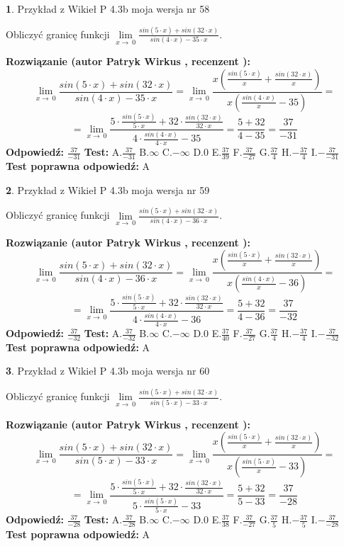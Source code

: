 \documentclass[12pt, a4paper]{article}
\theoremstyle{definition} %
\newtheorem{zad}{}
\newcommand{\zadStart}[1]{\begin{zad}#1\newline}
\newcommand{\zadStop}{\end{zad}}
\newcommand{\rozwStart}[2]{\noindent \textbf{Rozwiązanie (autor #1 , recenzent #2): }\newline}
\newcommand{\rozwStop}{\newline}
\newcommand{\odpStart}{\noindent \textbf{Odpowiedź:}\newline}
\newcommand{\odpStop}{\newline}
\newcommand{\testStart}{\noindent \textbf{Test:}\newline}
\newcommand{\testStop}{\newline}
\newcommand{\kluczStart}{\noindent \textbf{Test poprawna odpowiedź:}\newline}
\newcommand{\kluczStop}{\newline}
\begin{document}
\zadStart{Przykład z Wikieł P 4.3b moja wersja nr 58}


Obliczyć granicę funkcji $\lim\limits_{x\to\ 0}\frac{sin(5 \cdot x)+sin(32 \cdot x)}{sin(4 \cdot x)-35 \cdot x}$.
\zadStop
\rozwStart{Patryk Wirkus}{}
$$\lim\limits_{x\to\ 0}\frac{sin(5 \cdot x)+sin(32 \cdot x)}{sin(4 \cdot x)-35 \cdot x}=\lim\limits_{x\to\ 0}\frac{x(\frac{sin(5 \cdot x)}{x}+\frac{sin(32 \cdot x)}{x})}{x(\frac{sin(4 \cdot x)}{x}-35)}=$$
$$=\lim\limits_{x\to\ 0}\frac{5 \cdot \frac{sin(5 \cdot x)}{5 \cdot x}+32 \cdot \frac{sin(32 \cdot x)}{32 \cdot x}}{4 \cdot \frac{sin(4 \cdot x)}{4 \cdot x}-35}=\frac{5+32}{4-35} = \frac{37}{-31}$$
\rozwStop
\odpStart
$\frac{37}{-31}$
\odpStop
\testStart
A.$\frac{37}{-31}$
B.$\infty$
C.$-\infty$
D.$0$
E.$\frac{37}{39}$
F.$\frac{37}{-27}$
G.$\frac{37}{4}$
H.$-\frac{37}{4}$
I.$-\frac{37}{-31}$
\testStop
\kluczStart
A
\kluczStop



\zadStart{Przykład z Wikieł P 4.3b moja wersja nr 59}


Obliczyć granicę funkcji $\lim\limits_{x\to\ 0}\frac{sin(5 \cdot x)+sin(32 \cdot x)}{sin(4 \cdot x)-36 \cdot x}$.
\zadStop
\rozwStart{Patryk Wirkus}{}
$$\lim\limits_{x\to\ 0}\frac{sin(5 \cdot x)+sin(32 \cdot x)}{sin(4 \cdot x)-36 \cdot x}=\lim\limits_{x\to\ 0}\frac{x(\frac{sin(5 \cdot x)}{x}+\frac{sin(32 \cdot x)}{x})}{x(\frac{sin(4 \cdot x)}{x}-36)}=$$
$$=\lim\limits_{x\to\ 0}\frac{5 \cdot \frac{sin(5 \cdot x)}{5 \cdot x}+32 \cdot \frac{sin(32 \cdot x)}{32 \cdot x}}{4 \cdot \frac{sin(4 \cdot x)}{4 \cdot x}-36}=\frac{5+32}{4-36} = \frac{37}{-32}$$
\rozwStop
\odpStart
$\frac{37}{-32}$
\odpStop
\testStart
A.$\frac{37}{-32}$
B.$\infty$
C.$-\infty$
D.$0$
E.$\frac{37}{40}$
F.$\frac{37}{-27}$
G.$\frac{37}{4}$
H.$-\frac{37}{4}$
I.$-\frac{37}{-32}$
\testStop
\kluczStart
A
\kluczStop



\zadStart{Przykład z Wikieł P 4.3b moja wersja nr 60}


Obliczyć granicę funkcji $\lim\limits_{x\to\ 0}\frac{sin(5 \cdot x)+sin(32 \cdot x)}{sin(5 \cdot x)-33 \cdot x}$.
\zadStop
\rozwStart{Patryk Wirkus}{}
$$\lim\limits_{x\to\ 0}\frac{sin(5 \cdot x)+sin(32 \cdot x)}{sin(5 \cdot x)-33 \cdot x}=\lim\limits_{x\to\ 0}\frac{x(\frac{sin(5 \cdot x)}{x}+\frac{sin(32 \cdot x)}{x})}{x(\frac{sin(5 \cdot x)}{x}-33)}=$$
$$=\lim\limits_{x\to\ 0}\frac{5 \cdot \frac{sin(5 \cdot x)}{5 \cdot x}+32 \cdot \frac{sin(32 \cdot x)}{32 \cdot x}}{5 \cdot \frac{sin(5 \cdot x)}{5 \cdot x}-33}=\frac{5+32}{5-33} = \frac{37}{-28}$$
\rozwStop
\odpStart
$\frac{37}{-28}$
\odpStop
\testStart
A.$\frac{37}{-28}$
B.$\infty$
C.$-\infty$
D.$0$
E.$\frac{37}{38}$
F.$\frac{37}{-27}$
G.$\frac{37}{5}$
H.$-\frac{37}{5}$
I.$-\frac{37}{-28}$
\testStop
\kluczStart
A
\kluczStop
\end{document}
